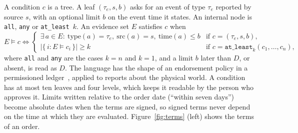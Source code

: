 \documentclass[10pt,a4paper]{article}
\newcommand{\code}[1]{\texttt{\small #1}}
\theoremstyle{tight}
\begin{document}
A condition $c$ is a tree. A leaf $(\tau_e, s, b)$ asks for an event of type $\tau_e$ reported by source $s$, with an
optional limit $b$ on the event time it states. An internal node is \code{all}, \code{any} or \code{at\_least}~$k$. An evidence set $E$
satisfies $c$ when
\begin{equation}\label{eq:sem}
E \models c \iff
\begin{cases}
\exists\, a \in E:\ \mathrm{type}(a)=\tau_e,\ \mathrm{src}(a)=s,\ \mathrm{time}(a)\le b & \text{if } c = (\tau_e,s,b),\\[2pt]
\bigl|\{\, i : E \models c_i \,\}\bigr| \ge k & \text{if } c = \texttt{at\_least}_k(c_1,\dots,c_n),
\end{cases}
\end{equation}
where \code{all} and \code{any} are the cases $k=n$ and $k=1$, and a limit $b$ later than $D$, or absent, is read
as $D$. The language has the shape of an endorsement policy in a
permissioned ledger~\cite{androulaki2018}, applied to reports about the physical world. A condition has at most ten
leaves and four levels, which keeps it readable by the person who approves it. Limits written relative to the order
date (``within seven days'') become absolute dates when the terms are signed, so signed terms never depend on the
time at which they are evaluated. Figure~\ref{fig:terms} (left) shows the terms of an order.
\end{document}
